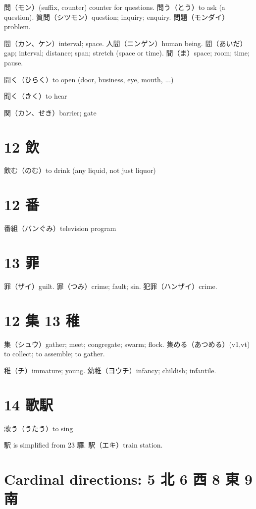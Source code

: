 問（モン）(suffix, counter) counter for questions.
問う（とう）to ask (a question).
質問（シツモン）question; inquiry; enquiry.
問題（モンダイ）problem.

間（カン、ケン）interval; space.
人間（ニンゲン）human being.
間（あいだ）gap; interval; distance; span; stretch (space or time).
間（ま）space; room; time; pause.

開く（ひらく）to open (door, business, eye, mouth, ...)

聞く（きく）to hear

関（カン、せき）barrier; gate

\section{12 飲}

飲む（のむ）to drink (any liquid, not just liquor)

\section{12 番}

番組（バンぐみ）television program

\section{13 罪}

罪（ザイ）guilt.
罪（つみ）crime; fault; sin.
犯罪（ハンザイ）crime.

\section{12 集 13 稚}

集（シュウ）gather; meet; congregate; swarm; flock.
集める（あつめる）(v1,vt) to collect; to assemble; to gather.

稚（チ）immature; young.
幼稚（ヨウチ）infancy; childish; infantile.

\section{14 歌駅}

歌う（うたう）to sing

駅 is simplified from 23 驛.
駅（エキ）train station.

\section{Cardinal directions: 5 北 6 西 8 東 9 南}

